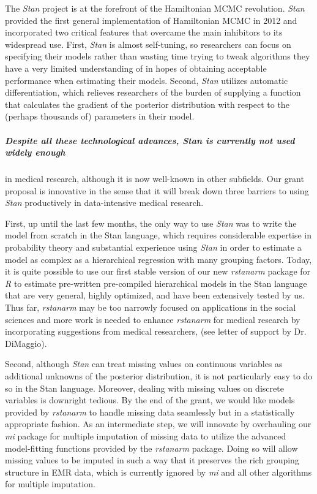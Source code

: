 \documentclass[11pt,notitlepage]{article}
\begin{document}
The \textit{Stan} project is at the forefront of the Hamiltonian MCMC revolution.
\textit{Stan} provided the first general implementation of Hamiltonian MCMC in 2012 and
incorporated two critical features that overcame the main inhibitors to its widespread
use. First, \textit{Stan} is almost self-tuning, so
researchers can focus on specifying their models rather than wasting time trying to
tweak algorithms they have a very limited understanding of in hopes of obtaining 
acceptable performance when estimating their models. Second, \textit{Stan} utilizes
automatic differentiation, which relieves researchers of the burden of supplying
a function that calculates the gradient of the posterior distribution with respect
to the (perhaps thousands of) parameters in their model.

\subparagraph{Despite all these technological advances, \textit{Stan} is currently not used widely enough}
in medical research, although it is now well-known in other subfields. Our grant
proposal is innovative in the sense that it will break down three barriers to using
\textit{Stan} productively in data-intensive medical research. 

First, up until the last few months, the only way to use \textit{Stan} was to write the 
model from scratch in the Stan language, which requires considerable expertise in 
probability theory and substantial experience using \textit{Stan} in order to estimate
a model as complex as a hierarchical regression with many grouping factors. Today, it
is quite possible to use our first stable version of our new \textit{rstanarm} package for \textit{R} to estimate
pre-written pre-compiled hierarchical models in the Stan language that are very general, highly
optimized, and have been extensively tested by us. Thus far, \textit{rstanarm}
may be too narrowly focused on applications in the social sciences and more work is needed to enhance
\textit{rstanarm} for medical research by incorporating suggestions from medical researchers,  (see letter of support by Dr. DiMaggio).

Second, although \textit{Stan} can treat missing values on continuous variables as 
additional unknowns of the posterior distribution, it is not particularly easy to do so
in the Stan language. Moreover, dealing with missing values on discrete variables is
downright tedious. By the end of the grant, we would like models provided by 
\textit{rstanarm} to handle missing data seamlessly but in a statistically appropriate
fashion. As an intermediate step, we will innovate by overhauling our \textit{mi}
package for multiple imputation of missing data to utilize the advanced model-fitting
functions provided by the \textit{rstanarm} package. Doing so will allow missing values
to be imputed in such a way that it preserves the rich grouping structure in EMR data, 
which is currently ignored by \textit{mi} and all other algorithms for multiple imputation.
\end{document}
